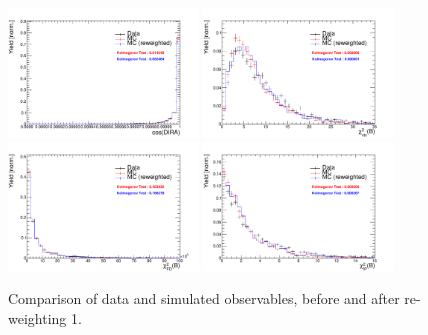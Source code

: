 \begin{figure}[h!]
\includegraphics[height=6.cm,width=0.45\textwidth]{figs/MC-v-Data/Bs_DIRA_OWNPV.pdf}
\includegraphics[height=6.cm,width=0.45\textwidth]{figs/MC-v-Data/Bs_ENDVERTEX_CHI2.pdf}\\
\includegraphics[height=6.cm,width=0.45\textwidth]{figs/MC-v-Data/Bs_FDCHI2_OWNPV.pdf}
\includegraphics[height=6.cm,width=0.45\textwidth]{figs/MC-v-Data/Bs_IPCHI2_OWNPV.pdf}
\caption{Comparison of data and simulated observables, before and after re-weighting 1.}
\end{figure}

